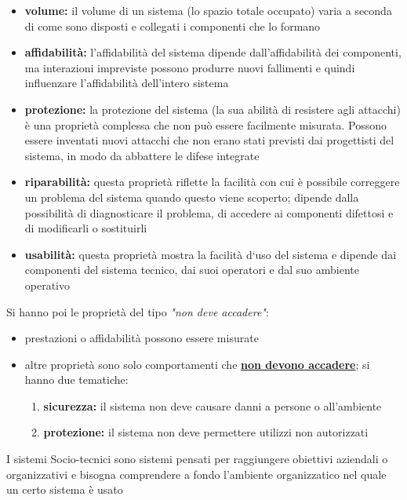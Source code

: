 \documentclass[a4paper,12pt, oneside]{book}
\begin{document}
\begin{itemize}
\item \textbf{volume:} il volume di un sistema (lo spazio totale occupato) varia a seconda di come sono
disposti e collegati i componenti che lo formano
\item \textbf{affidabilità:} l'affidabilità del sistema dipende dall'affidabilità dei componenti, ma interazioni
impreviste possono produrre nuovi fallimenti e quindi influenzare l'affidabilità dell'intero sistema
\item \textbf{protezione:} la protezione del sistema (la sua abilità di resistere agli attacchi) è una proprietà
complessa che non può essere facilmente misurata. Possono essere inventati nuovi attacchi che non erano stati previsti dai progettisti del sistema, in modo da abbattere le difese integrate
\item \textbf{riparabilità:} questa proprietà riflette la facilità con cui è possibile correggere un problema del
sistema quando questo viene scoperto; dipende dalla possibilità di diagnosticare il problema, di accedere ai componenti difettosi e di modificarli o sostituirli
\item \textbf{usabilità:} questa proprietà mostra la facilità d‘uso del sistema e dipende dai componenti del
sistema tecnico, dai suoi operatori e dal suo ambiente operativo
\end{itemize}
Si hanno poi le proprietà del tipo \textit{"non deve accadere"}:
\begin{itemize}
\item prestazioni o affidabilità possono essere misurate
\item altre proprietà sono solo comportamenti che \underline{\textbf{non devono accadere}}; si hanno due tematiche:
\begin{enumerate}
\item \textbf{sicurezza:} il sistema non deve causare danni a
persone o all'ambiente
\item \textbf{protezione: }il sistema non deve permettere utilizzi non autorizzati
\end{enumerate}
\end{itemize}
I sistemi Socio-tecnici sono sistemi pensati per
raggiungere obiettivi aziendali o organizzativi e bisogna comprendere a fondo l'ambiente organizzatico nel quale un certo sistema è usato
\end{document}
